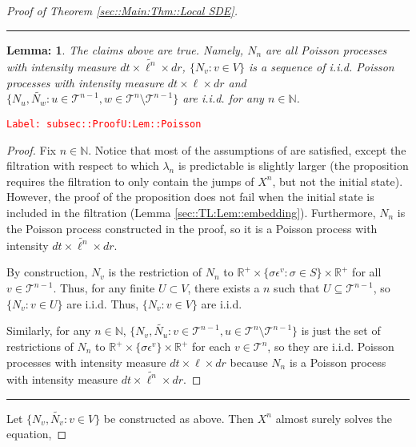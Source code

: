 \documentclass[12pt]{article}
\newcommand{\mb}{\mathbb}
\newcommand{\mc}{\mathcal}
\newcommand{\ep}{\epsilon}
\newcommand{\tr}{\textcolor{red}}
\newcommand{\labe}[1]{\tr{\texttt{Label: #1}}}
\newcommand{\ind}{\hspace{24pt}}
\newcommand{\lin}{\rule{\linewidth}{0.4 pt}}
\renewcommand{\v}{v}							%
\newcommand{\vv}{u}								%
\newcommand{\vvv}{w}							%
\renewcommand{\U}{U}							%
\renewcommand{\S}{S}							%
\newcommand{\s}{\sigma}							%
\newcommand{\ev}[1]{\ep^{#1}}					%
\renewcommand{\t}{t}							%
\newcommand{\poiss}[1]{N_{#1}}						%
\newcommand{\pup}[1]{^{#1}}							%
\newcommand{\tree}{\mc{T}}							%
\newcommand{\V}{V}									%
\renewcommand{\r}{r}								%
\newcommand{\numb}{n}								%
\newcommand{\rxvtsn}[3]{X_{#1}^{#3}{#2}}			%
\newcommand{\rate}[1]{\lambda_{#1}}					%
\newcommand{\Sm}{\ell}								%
\newcommand{\alt}{\widetilde}						%
\newtheorem{lem}[thms]{Lemma: }
\begin{document}
\begin{proof}[Proof of Theorem \ref{sec::Main:Thm::Local SDE}]
\lin

\begin{lem}
The claims above are true. Namely, \(\poiss{\numb}\) are all Poisson processes with intensity measure \(d\t\times\alt{\Sm^{\numb}}\times d\r\), \(\{\poiss{\v}:\v\in\V\}\) is a sequence of i.i.d. Poisson processes with intensity measure \(d\t\times\Sm\times d\r\) and \(\{\poiss{\vv},\alt{\poiss{\vvv}}:\vv\in \tree\pup{\numb-1},\vvv\in\tree\pup{\numb}\setminus\tree\pup{\numb-1}\}\) are i.i.d. for any \(\numb \in \mb{N}\).

\label{subsec::ProofU:Lem::Poisson}
\end{lem}
\labe{subsec::ProofU:Lem::Poisson}
\begin{proof}

Fix \(\numb \in \mb{N}\). Notice that most of the assumptions of \cite[Proposition 14.7.I(b)]{DalVer08} are satisfied, except the filtration with respect to which \(\rate{\numb}\) is predictable is slightly larger (the proposition requires the filtration to only contain the jumps of \(\rxvtsn{}{}{\numb}\), but not the initial state). However, the proof of the proposition does not fail when the initial state is included in the filtration (Lemma \ref{sec::TL:Lem::embedding}). Furthermore, \(\poiss{\numb}\) is the Poisson process constructed in the proof, so it is a Poisson process with intensity \(d\t\times \alt{\Sm^\numb}\times d\r\).

\ind By construction, \(\poiss{\v}\) is the restriction of \(\poiss{\numb}\) to \(\mb{R}^+ \times \{\s\ev{\v}: \s\in \S\}\times \mb{R}^+\) for all \(\v\in \tree\pup{\numb-1}\). Thus, for any finite \(\U \subset \V\), there exists a \(\numb\) such that \(\U \subseteq \tree\pup{\numb-1}\), so \(\{\poiss{\v}: \v\in \U\}\) are i.i.d. Thus, \(\{\poiss{\v}: \v\in \V\}\) are i.i.d.

\ind Similarly, for any \(\numb \in \mb{N}\), \(\{\poiss{\v},\alt{\poiss{\vv}}: \v \in \tree\pup{\numb-1},\vv\in\tree\pup{\numb}\setminus\tree\pup{\numb-1}\}\) is just the set of restrictions of \(\poiss{\numb}\) to \(\mb{R}^+\times\{\s\ev{\v}\}\times\mb{R}^+\) for each \(\v\in \tree\pup{\numb}\), so they are i.i.d. Poisson processes with intensity measure \(d\t\times \Sm\times d\r\) because \(\poiss{\numb}\) is a Poisson process with intensity measure \(d\t\times\alt{\Sm^\numb}\times d\r\).
\end{proof}

\lin

Let \(\{\poiss{\v},\alt{\poiss{\v}}:\v\in\V\}\) be constructed as above. Then \(\rxvtsn{}{}{\numb}\) almost surely solves the equation,


\end{proof}
\end{document}
